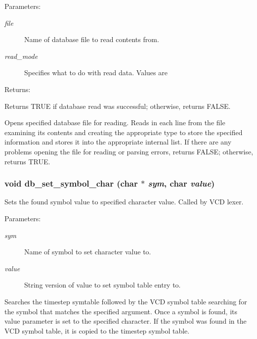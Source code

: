 \begin{Desc}
\item[Parameters: ]\par
\begin{description}
\item[{\em 
file}]Name of database file to read contents from. \item[{\em 
read\_\-mode}]Specifies what to do with read data. Values are
\end{description}
\end{Desc}
\begin{Desc}
\item[Returns: ]\par
Returns TRUE if database read was successful; otherwise, returns FALSE.\end{Desc}
Opens specified database file for reading. Reads in each line from the file examining its contents and creating the appropriate type to store the specified information and stores it into the appropriate internal list. If there are any problems opening the file for reading or parsing errors, returns FALSE; otherwise, returns TRUE. 
\subsubsection{\setlength{\rightskip}{0pt plus 5cm}void db\_\-set\_\-symbol\_\-char (char $\ast$ {\em sym}, char {\em value})}\label{db_8c_a33}


Sets the found symbol value to specified character value. Called by VCD lexer.

\begin{Desc}
\item[Parameters: ]\par
\begin{description}
\item[{\em 
sym}]Name of symbol to set character value to. \item[{\em 
value}]String version of value to set symbol table entry to.\end{description}
\end{Desc}
Searches the timestep symtable followed by the VCD symbol table searching for the symbol that matches the specified argument. Once a symbol is found, its value parameter is set to the specified character. If the symbol was found in the VCD symbol table, it is copied to the timestep symbol table. 
